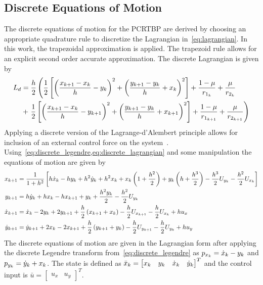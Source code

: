 \documentclass[letterpaper, preprint, paper,11pt]{AAS}	%
\begin{document}
\subsection{Discrete Equations of Motion}
The discrete equations of motion for the PCRTBP are derived by choosing an appropriate quadrature rule to discretize the Lagrangian in~\cref{eq:lagrangian}. 
In this work, the trapezoidal approximation is applied.
The trapezoid rule allows for an explicit second order accurate approximation.
The discrete Lagrangian is given by
\begin{align}\label{eq:discrete_lagrangian}
	L_d &= \frac{h}{2} \left( \frac{1}{2} \bracket{\left(  \frac{\xkp - \xk}{h} -\yk \right)^2 + \left( \frac{\ykp - \yk}{h} + \xk \right)^2} + \frac{1 - \mu}{r_{1_k}} + \frac{\mu}{r_{2_k}} \right. \nonumber \\ 
	&+ \left. \frac{1}{2} \bracket{\left(  \frac{\xkp - \xk}{h} -\ykp \right)^2 + \left( \frac{\ykp - \yk}{h} + \xkp \right)^2} + \frac{1-\mu}{r_{1_{k+1}}} + \frac{\mu}{r_{2_{k+1}}}  \right)
\end{align}
Applying a discrete version of the Lagrange-d'Alembert principle allows for inclusion of an external control force on the system~\cite{marsden2001}.
Using~\cref{eq:discrete_legendre,eq:discrete_lagrangian} and some manipulation the equations of motion are given by
\begin{subequations}\label{eq:discrete_eoms}
\begin{align}
	\xkp &= \frac{1}{1+ h^2} \bracket{h \dot{x}_k - h \yk + h^2 \dot{y}_k + h^2 \xk + \xk \parenth{1+ \frac{h^2}{2}} + \yk \parenth{h + \frac{h^3}{2}} - \frac{h^3}{2} U_{y_k} - \frac{h^2}{2} U_{x_k} } \label{eq:xkp}\\
	\ykp &= h \dot{y}_k + h \xk - h \xkp + \yk + \frac{h^2 \yk}{2} - \frac{h^2 }{2} U_{y_k} \label{eq:ykp}\\
	\dot{x}_{k+1} &= \dot{x}_k - 2 \yk + 2 \ykp + \frac{h}{2} \parenth{\xkp + \xk} - \frac{h}{2} U_{\xkp} - \frac{h}{2} U_{\xk} + h u_x \label{eq:xdotkp}\\
	\dot{y}_{k+1} &= \dot{y}_{k+1} + 2 \xk - 2 \xkp + \frac{h}{2} \parenth{\ykp + \yk} - \frac{h}{2} U_{\ykp} - \frac{h}{2} U_{\yk} + h u_y \label{eq:ydotkp}
\end{align}
\end{subequations}
The discrete equations of motion are given in the Lagrangian form after applying the discrete Legendre transform from~\cref{eq:discrete_legendre} as \( p_{x_k} = \dot{x}_k - y_{k} \) and \( p_{y_{k}} = \dot{y}_k + x_k \).
The state is defined as \( \bar{ x}_k = \begin{bmatrix} x_k & y_{k} & \dot{x}_k & \dot{y}_k \end{bmatrix}^T\) and the control input is \( \bar{u} = \begin{bmatrix} u_x & u_y \end{bmatrix}^T \).
\end{document}

